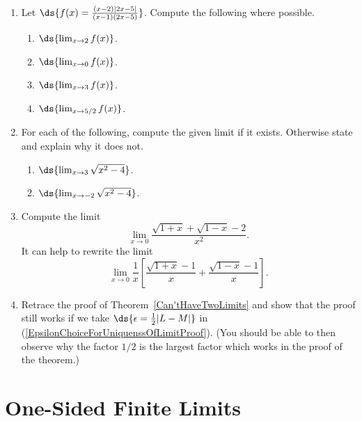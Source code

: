 \begin{multicols}{2}
\begin{enumerate}
\item  Let $\ds{f(x)=\frac{(x-2)|2x-5|}{(x-1)(2x-5)}}$.
Compute the following where possible.
 \begin{enumerate}
 \item $\ds{\lim_{x\to2}f(x)}$.
 \item $\ds{\lim_{x\to0}f(x)}$.
 \item $\ds{\lim_{x\to3}f(x)}$.
 \item $\ds{\lim_{x\to5/2}f(x)}$.
 \end{enumerate}
\item For each of the following, compute the given
limit if it exists.  Otherwise state and explain why it does not.
 \begin{enumerate}
 \item $\ds{\lim_{x\to3}\sqrt{x^2-4}}$.
 \item $\ds{\lim_{x\to-2}\sqrt{x^2-4}}$.

 \end{enumerate}



\item Compute the limit
$$\lim_{x\to0}\frac{\sqrt{1+x}+\sqrt{1-x}-2}{x^2}.$$
It can help to rewrite the limit
$$\lim_{x\to0}\frac1x\left[\frac{\sqrt{1+x}-1}x+
      \frac{\sqrt{1-x}-1}x\right].$$

\item Retrace the proof of Theorem~\ref{Can'tHaveTwoLimits} and
show that the proof still works if we take 
$\ds{\epsilon=\frac12|L-M|}$ in 
(\ref{EpsilonChoiceForUniquenssOfLimitProof}).
(You should be able to then observe why the factor
$1/2$ is the largest factor which works in the proof
of the theorem.)
\end{enumerate}
\end{multicols}


\newpage
\section{One-Sided Finite Limits}


